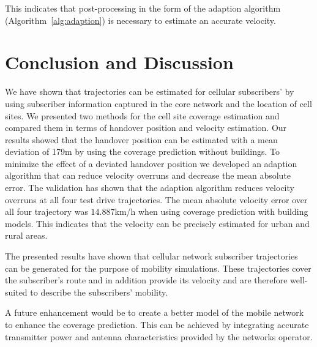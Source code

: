 This indicates that post-processing in the form of the adaption algorithm (Algorithm~\ref{alg:adaption}) is necessary to estimate an accurate velocity. 

\section{Conclusion and Discussion}
We have shown that trajectories can be estimated for cellular subscribers' by using subscriber information captured in the core network and the location of cell sites. We presented two methods for the cell site coverage estimation and compared them in terms of handover position and velocity estimation. Our results showed that the handover position can be estimated with a mean deviation of 179m by using the coverage prediction without buildings. To minimize the effect of a deviated handover position we developed an adaption algorithm that can reduce velocity overruns and decrease the mean absolute error. The validation has shown that the adaption algorithm reduces velocity overruns at all four test drive trajectories. The mean absolute velocity error over all four trajectory was $14.887$km/h when using coverage prediction with building models. This indicates that the velocity can be precisely estimated for urban and rural areas.

The presented results have shown that cellular network subscriber trajectories can be generated for the purpose of mobility simulations. These trajectories cover the subscriber's route and in addition provide its velocity and are therefore well-suited to describe the subscribers' mobility. %

A future enhancement would be to create a better model of the mobile network to enhance the coverage prediction. This can be achieved by integrating accurate transmitter power and antenna characteristics provided by the networks operator.
